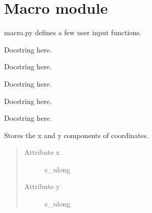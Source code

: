 \documentclass[letterpaper,10pt,english]{sphinxmanual}
\begin{document}
\section{Macro module}
\label{macro:macro-module}\label{macro:module-macro}\label{macro::doc}
macro.py defines a few user input functions.

\begin{fulllineitems}
\label{macro:macro.GetKeydown}
Docstring here.

\end{fulllineitems}


\begin{fulllineitems}
\label{macro:macro.HardwareInput}
Docstring here.

\end{fulllineitems}


\begin{fulllineitems}
\label{macro:macro.Input}
Docstring here.

\end{fulllineitems}


\begin{fulllineitems}
\label{macro:macro.Input_I}
Docstring here.

\end{fulllineitems}


\begin{fulllineitems}
\label{macro:macro.KeyBdInput}
Docstring here.

\end{fulllineitems}


\begin{fulllineitems}
\label{macro:macro.MacroPoint}
Stores the x and y components of coordinates.
\begin{quote}\begin{description}
\item[{Attribute x}] \leavevmode
c\_ulong

\item[{Attribute y}] \leavevmode
c\_ulong

\end{description}\end{quote}

\end{fulllineitems}
\end{document}
